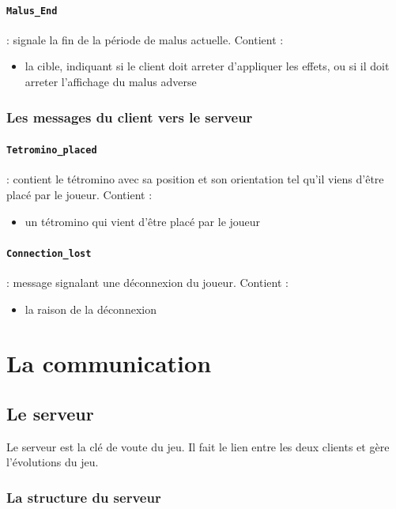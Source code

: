 \documentclass[a4paper, 12pt]{article}
\begin{document}
				\paragraph{\texttt{Malus\_End}} : signale la fin de la période de malus actuelle. Contient : 
					\begin{itemize}
						\item la cible, indiquant si le client doit arreter d'appliquer les effets, ou si il doit arreter l'affichage du malus adverse
					\end{itemize}

			\subsubsection{Les messages du client vers le serveur}

				\paragraph{\texttt{Tetromino\_placed}} : contient le tétromino avec sa position et son orientation tel qu'il viens d'être placé par le joueur. Contient :
					\begin{itemize}
						\item un tétromino qui vient d'être placé par le joueur
					\end{itemize}
				\paragraph{\texttt{Connection\_lost}} : message signalant une déconnexion du joueur. Contient :
					\begin{itemize}
						\item la raison de la déconnexion
					\end{itemize}
			

\section{La communication}
	\subsection{Le serveur}

		Le serveur est la clé de voute du jeu. Il fait le lien entre les deux clients et gère l'évolutions du jeu.

		\subsubsection{La structure du serveur}
\end{document}
